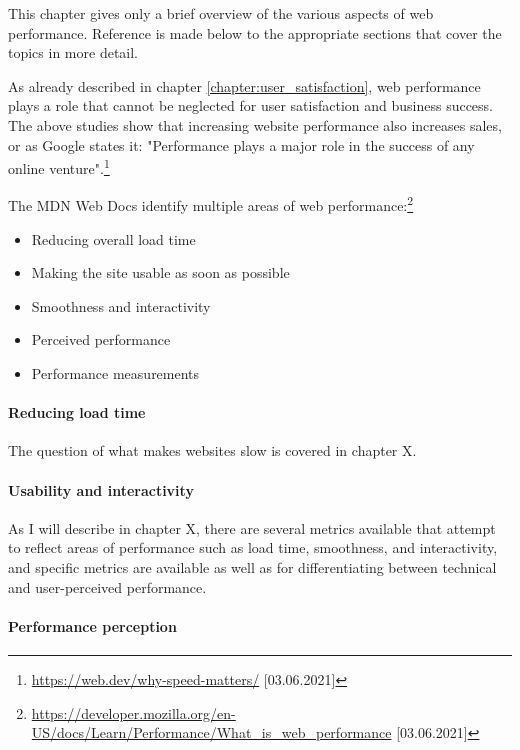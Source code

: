 

This chapter gives only a brief overview of the various aspects of web performance.
Reference is made below to the appropriate sections that cover the topics in more detail.

As already described in chapter \ref{chapter:user_satisfaction}, web performance plays a role that cannot be neglected for user satisfaction and business success.
The above studies show that increasing website performance also increases sales, or as Google states it: "Performance plays a major role in the success of any online venture".\footnote{\url{https://web.dev/why-speed-matters/} [03.06.2021]}

The MDN Web Docs identify multiple areas of web performance:\footnote{\url{https://developer.mozilla.org/en-US/docs/Learn/Performance/What_is_web_performance} [03.06.2021]}
\begin{itemize}
\item Reducing overall load time
\item Making the site usable as soon as possible
\item Smoothness and interactivity
\item Perceived performance
\item Performance measurements
\end{itemize}

\paragraph{Reducing load time}

The question of what makes websites slow is covered in chapter X.


\paragraph{Usability and interactivity}

As I will describe in chapter X, there are several metrics available that attempt to reflect areas of performance such as load time, smoothness, and interactivity, and specific metrics are available as well as for differentiating between technical and user-perceived performance.


\paragraph{Performance perception}

